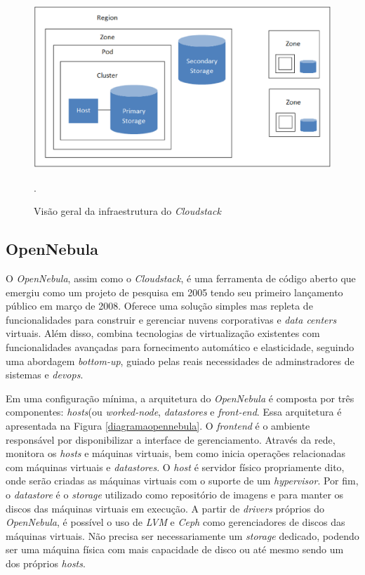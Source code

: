 \begin{figure}[!htb]
\centering
\includegraphics [keepaspectratio=true,scale=0.50]{figuras/cloudstack_structure.eps}
\caption{Visão geral da infraestrutura do \textit{Cloudstack}}
\cite{cloudstack}.
\label{diagramacloudstack}
\end{figure}

\subsection{OpenNebula}
O \textit{OpenNebula}, assim como o \textit{Cloudstack}, é uma ferramenta de código aberto que emergiu como um projeto de pesquisa em 2005 tendo seu primeiro lançamento público em março de 2008. Oferece uma solução simples mas repleta de funcionalidades para construir e gerenciar nuvens corporativas e \textit{data centers} virtuais. Além disso, combina tecnologias de virtualização existentes com funcionalidades avançadas para fornecimento automático e elasticidade, seguindo uma abordagem \textit{bottom-up}, guiado pelas reais necessidades de adminstradores de sistemas e \textit{devops}\cite{opennebula}.

Em uma configuração mínima, a arquitetura do \textit{OpenNebula} é composta por três componentes: \textit{hosts}(ou \textit{worked-node}, \textit{datastores} e \textit{front-end}. Essa arquitetura é apresentada na Figura \ref{diagramaopennebula}. O \textit{frontend} é o ambiente responsável por disponibilizar a interface de gerenciamento. Através da rede, monitora os \textit{hosts} e máquinas virtuais, bem como inicia operações relacionadas com máquinas virtuais e \textit{datastores}. O \textit{host} é  servidor físico propriamente dito, onde serão criadas as máquinas virtuais com o suporte de um \textit{hypervisor}. Por fim, o \textit{datastore} é o \textit{storage} utilizado como repositório de imagens e para manter os discos das máquinas virtuais em execução. A partir de \textit{drivers} próprios do \textit{OpenNebula}, é possível o uso de \textit{LVM} e \textit{Ceph} como gerenciadores de discos das máquinas virtuais. Não precisa ser necessariamente um \textit{storage} dedicado, podendo ser uma máquina física com mais capacidade de disco ou até mesmo sendo um dos próprios \textit{hosts}.  

